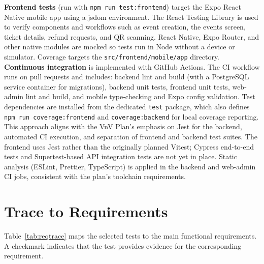 \documentclass[12pt, titlepage]{article}
\begin{document}
\textbf{Frontend tests} (run with \texttt{npm run test:frontend}) target the Expo React Native mobile app using a jsdom environment. The React Testing
Library is used to verify components and workflows such as event creation, the events screen, ticket details, refund requests, and QR scanning. React
Native, Expo Router, and other native modules are mocked so tests run in Node without a device or simulator. Coverage targets the
\texttt{src/frontend/mobile/app} directory.\\

\textbf{Continuous integration} is implemented with GitHub Actions. The CI workflow runs on pull requests and includes: backend lint and build (with
a PostgreSQL service container for migrations), backend unit tests, frontend unit tests, web-admin lint and build, and mobile type-checking and Expo
config validation. Test dependencies are installed from the dedicated \texttt{test} package, which also defines \texttt{npm run coverage:frontend} 
and \texttt{coverage:backend} for local coverage reporting.\\

This approach aligns with the VnV Plan's emphasis on Jest for the backend, automated CI execution, and separation of frontend and backend test suites.
 The frontend uses Jest rather than the originally planned Vitest; Cypress end-to-end tests and Supertest-based API integration tests are not yet in
  place. Static analysis (ESLint, Prettier, TypeScript) is applied in the backend and web-admin CI jobs, consistent with the plan's toolchain requirements.\\

\section{Trace to Requirements}

Table~\ref{tab:reqtrace} maps the selected tests to the main functional
requirements. A checkmark indicates that the test provides evidence for the
corresponding requirement.
\end{document}
